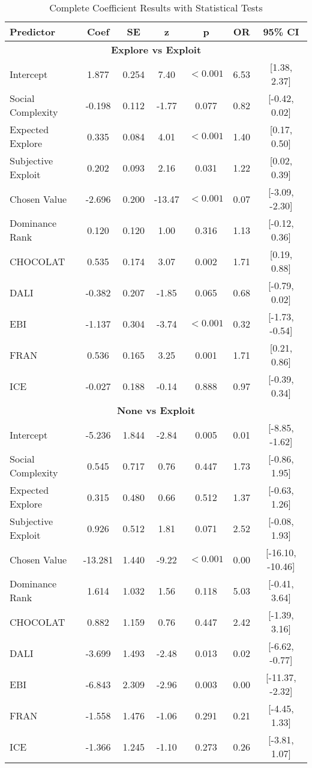\documentclass[11pt,a4paper]{article}
\begin{document}
\begin{longtable}{lcccccc}
\caption{Complete Coefficient Results with Statistical Tests} \\
\toprule
\textbf{Predictor} & \textbf{Coef} & \textbf{SE} & \textbf{z} & \textbf{p} & \textbf{OR} & \textbf{95\% CI} \\
\midrule
\endfirsthead
\multicolumn{7}{c}{\textbf{Explore vs Exploit}} \\
\midrule
Intercept & 1.877 & 0.254 & 7.40 & $< 0.001$ & 6.53 & [1.38, 2.37] \\
Social Complexity & -0.198 & 0.112 & -1.77 & 0.077 & 0.82 & [-0.42, 0.02] \\
Expected Explore & 0.335 & 0.084 & 4.01 & $< 0.001$ & 1.40 & [0.17, 0.50] \\
Subjective Exploit & 0.202 & 0.093 & 2.16 & 0.031 & 1.22 & [0.02, 0.39] \\
Chosen Value & -2.696 & 0.200 & -13.47 & $< 0.001$ & 0.07 & [-3.09, -2.30] \\
Dominance Rank & 0.120 & 0.120 & 1.00 & 0.316 & 1.13 & [-0.12, 0.36] \\
CHOCOLAT & 0.535 & 0.174 & 3.07 & 0.002 & 1.71 & [0.19, 0.88] \\
DALI & -0.382 & 0.207 & -1.85 & 0.065 & 0.68 & [-0.79, 0.02] \\
EBI & -1.137 & 0.304 & -3.74 & $< 0.001$ & 0.32 & [-1.73, -0.54] \\
FRAN & 0.536 & 0.165 & 3.25 & 0.001 & 1.71 & [0.21, 0.86] \\
ICE & -0.027 & 0.188 & -0.14 & 0.888 & 0.97 & [-0.39, 0.34] \\
\midrule
\multicolumn{7}{c}{\textbf{None vs Exploit}} \\
\midrule
Intercept & -5.236 & 1.844 & -2.84 & 0.005 & 0.01 & [-8.85, -1.62] \\
Social Complexity & 0.545 & 0.717 & 0.76 & 0.447 & 1.73 & [-0.86, 1.95] \\
Expected Explore & 0.315 & 0.480 & 0.66 & 0.512 & 1.37 & [-0.63, 1.26] \\
Subjective Exploit & 0.926 & 0.512 & 1.81 & 0.071 & 2.52 & [-0.08, 1.93] \\
Chosen Value & -13.281 & 1.440 & -9.22 & $< 0.001$ & 0.00 & [-16.10, -10.46] \\
Dominance Rank & 1.614 & 1.032 & 1.56 & 0.118 & 5.03 & [-0.41, 3.64] \\
CHOCOLAT & 0.882 & 1.159 & 0.76 & 0.447 & 2.42 & [-1.39, 3.16] \\
DALI & -3.699 & 1.493 & -2.48 & 0.013 & 0.02 & [-6.62, -0.77] \\
EBI & -6.843 & 2.309 & -2.96 & 0.003 & 0.00 & [-11.37, -2.32] \\
FRAN & -1.558 & 1.476 & -1.06 & 0.291 & 0.21 & [-4.45, 1.33] \\
ICE & -1.366 & 1.245 & -1.10 & 0.273 & 0.26 & [-3.81, 1.07] \\
\bottomrule
\end{longtable}
\end{document}
